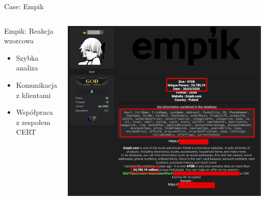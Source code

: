 \begin{frame}{Case: Empik}
\begin{columns}[c]
    \begin{exampleblock}{Empik: Reakcja wzorcowa}
    \begin{itemize}
      \item Szybka analiza
      \item Komunikacja z klientami
      \item Współpraca z zespołem CERT \cite{empik}
    \end{itemize}
    \end{exampleblock}
    \includegraphics[width=1\textwidth]{images/empik-wyciek.jpg}
\end{columns}
\end{frame}

